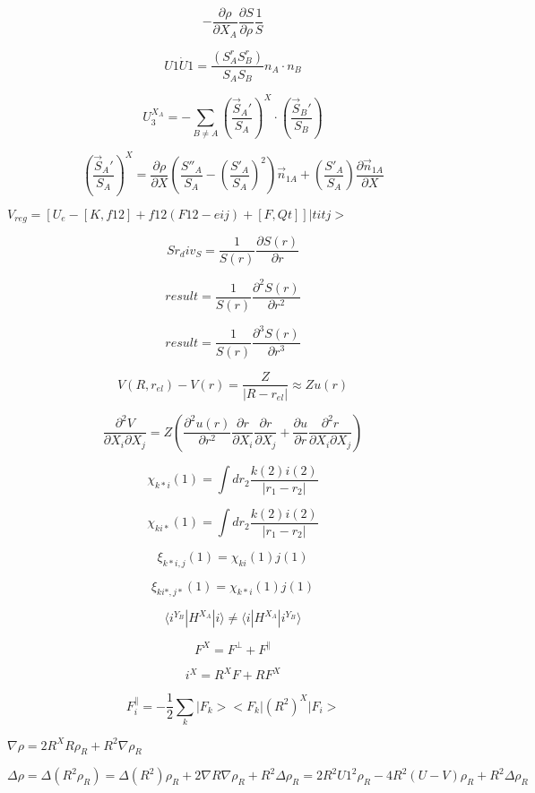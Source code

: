 \documentclass{article}
\begin{document}
\[
 -\frac{\partial \rho}{\partial X_A}\frac{\partial S}{\partial \rho}\frac{1}{S}
\]
\pagebreak

\[
 U1\dot U1 = \frac{\left(S^r_A S^r_B\right)}{S_A S_B} n_A \cdot n_B
\]
\pagebreak

\[
U_3^{X_A} = -\sum_{B\neq A}\left(\frac{\vec S_A'}{S_A}\right)^X\cdot\left(\frac{\vec S_B'}{S_B}\right)
\]
\pagebreak

\[
\left(\frac{\vec S_A'}{S_A}\right)^X =
    \frac{\partial \rho}{\partial X}\left(\frac{S''_A}{S_A}
         -\left(\frac{S'_A}{S_A}\right)^2\right)\vec n_{1A}
    + \left(\frac{S'_A}{S_A}\right)\frac{\partial \vec n_{1A}}{\partial X}
\]
\pagebreak

$ V_{reg} = [ U_e - [K,f12] + f12(F12-eij) + [F,Qt] ]|titj> $
\pagebreak

\[
    Sr_div_S = \frac{1}{S(r)}\frac{\partial S(r)}{\partial r}
\]
\pagebreak

\[
    result = \frac{1}{S(r)}\frac{\partial^2 S(r)}{\partial r^2}
\]
\pagebreak

\[
   result = \frac{1}{S(r)}\frac{\partial^3 S(r)}{\partial r^3}
\]
\pagebreak

\[
V(R,r_{el}) -V(r) =\frac{Z}{|R-r_{el}|} \approx Z u(r) \]
\pagebreak

\[
\frac{\partial^2 V}{\partial X_i\partial X_j}
  =  Z \left(\frac{\partial^2 u(r)}{\partial r^2} \frac{\partial r}{\partial X_i}
     \frac{\partial r}{\partial X_j} + \frac{\partial u}{\partial r}
     \frac{\partial^2 r}{\partial X_i \partial X_j}\right)
\]
\pagebreak

\[ \chi_{k{*} i}(1) = \int dr_2 \frac{k(2) i(2)}{|r_1-r_2|} \]
\pagebreak

\[ \chi_{ki{*}}(1) = \int dr_2 \frac{k(2) i(2)}{|r_1-r_2|} \]
\pagebreak

\[ \xi_{k{*}i,j}(1) = \chi_{ki}(1) j(1) \]
\pagebreak

\[ \xi_{ki{*},j{*}}(1) = \chi_{k{*}i}(1) j(1) \]
\pagebreak

\[
 \langle i^{Y_B}|H^{X_A}|i\rangle \neq \langle i|H^{X_A}|i^{Y_B}\rangle
\]
\pagebreak

\[
    F^X = F^\perp + F^\parallel
\]
\pagebreak

\[
  i^X   = R^X F + R F^X
\]
\pagebreak

\[
 F_i^\parallel = -\frac{1}{2}\sum_k|F_k ><F_k | (R^2)^X | F_i>
\]
\pagebreak

$ \nabla\rho = 2R^X R \rho_R + R^2\nabla \rho_R $
\pagebreak

\[
  \Delta \rho = \Delta (R^2 \rho_R)
         = \Delta (R^2) \rho_R + 2\nabla R \nabla \rho_R + R^2 \Delta \rho_R
         = 2 R^2 U1^2 \rho_R -4 R^2 ( U-V ) \rho_R + R^2 \Delta\rho_R
\]
\pagebreak
\end{document}
